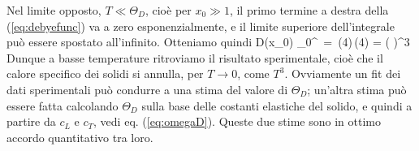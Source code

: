 Nel limite opposto, $T \ll \Theta_D$, cioè per $x_0 \gg 1$, il primo termine a destra della (\ref{eq:debyefunc}) va a zero esponenzialmente, e il limite superiore dell'integrale può essere spostato all'infinito. Otteniamo quindi
\be
D(x_0) \simeq {}\int_0^\infty{}\,
= \,\Gamma(4)\,\zeta(4) = \left(
\right)^3
\ee
Dunque a basse temperature ritroviamo il risultato sperimentale, cioè che il calore specifico dei solidi si annulla, per $T \to 0$, come $T^3$. Ovviamente un fit dei dati sperimentali può condurre a una stima del valore di $\Theta_D$; un'altra stima può essere fatta calcolando $\Theta_D$ sulla base delle costanti elastiche del solido, e quindi a partire da $c_L$ e $c_T$, vedi eq. (\ref{eq:omegaD}). Queste due stime sono in ottimo accordo quantitativo tra loro.



